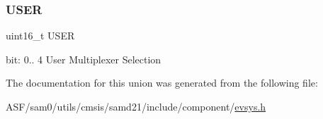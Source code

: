 \subsubsection{\texorpdfstring{USER}{USER}}
{\footnotesize\ttfamily uint16\+\_\+t U\+S\+ER}

bit\+: 0.. 4 User Multiplexer Selection 

The documentation for this union was generated from the following file\+:\begin{DoxyCompactItemize}
\item 
A\+S\+F/sam0/utils/cmsis/samd21/include/component/\mbox{\hyperlink{component_2evsys_8h}{evsys.\+h}}\end{DoxyCompactItemize}
